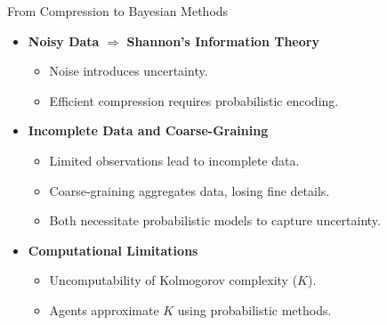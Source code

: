 \begin{frame}{From Compression to Bayesian Methods}
\begin{itemize}
    \item \textbf{Noisy Data} $\Rightarrow$ \textbf{Shannon's Information Theory}
    \begin{itemize}
        \item Noise introduces uncertainty.
        \item Efficient compression requires probabilistic encoding.
    \end{itemize}
    \item \textbf{Incomplete Data and Coarse-Graining}
    \begin{itemize}
        \item Limited observations lead to incomplete data.
        \item Coarse-graining aggregates data, losing fine details.
        \item Both necessitate probabilistic models to capture uncertainty.
    \end{itemize}
    \item \textbf{Computational Limitations}
    \begin{itemize}
        \item Uncomputability of Kolmogorov complexity ($K$).
        \item Agents approximate $K$ using probabilistic methods.
    \end{itemize}
\end{itemize}
\end{frame}

